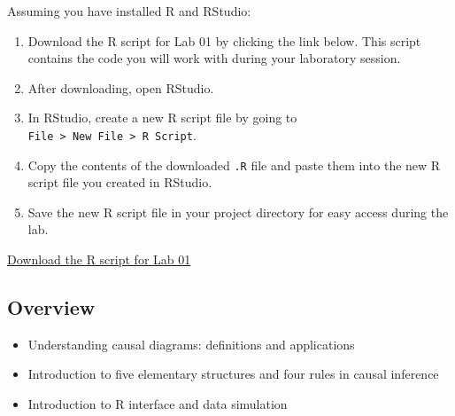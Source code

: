 \documentclass[
  singlecolumn]{article}
\providecommand{\tightlist}{%
  \setlength{\itemsep}{0pt}\setlength{\parskip}{0pt}}\usepackage{longtable,booktabs,array}
\theoremstyle{definition}
\theoremstyle{remark}
\begin{document}
\begin{tcolorbox}[enhanced jigsaw, colback=white, rightrule=.15mm, opacityback=0, toptitle=1mm, bottomtitle=1mm, toprule=.15mm, bottomrule=.15mm, colbacktitle=quarto-callout-important-color!10!white, left=2mm, titlerule=0mm, colframe=quarto-callout-important-color-frame, coltitle=black, title=\textcolor{quarto-callout-important-color}{\faExclamation}\hspace{0.5em}{Download Your Laboratory R Script Here}, arc=.35mm, leftrule=.75mm, breakable, opacitybacktitle=0.6]

Assuming you have installed R and RStudio:

\begin{enumerate}
\def\labelenumi{\arabic{enumi}.}
\item
  Download the R script for Lab 01 by clicking the link below. This
  script contains the code you will work with during your laboratory
  session.
\item
  After downloading, open RStudio.
\item
  In RStudio, create a new R script file by going to
  \texttt{File\ \textgreater{}\ New\ File\ \textgreater{}\ R\ Script}.
\item
  Copy the contents of the downloaded \texttt{.R} file and paste them
  into the new R script file you created in RStudio.
\item
  Save the new R script file in your project directory for easy access
  during the lab.
\end{enumerate}

\href{https://raw.githubusercontent.com/go-bayes/psyc-434-2024/main/laboratory/01-lab.R}{Download
the R script for Lab 01}

\end{tcolorbox}

\subsection{Overview}\label{overview}

\begin{itemize}
\tightlist
\item
  Understanding causal diagrams: definitions and applications
\item
  Introduction to five elementary structures and four rules in causal
  inference
\item
  Introduction to R interface and data simulation
\end{itemize}
\end{document}
